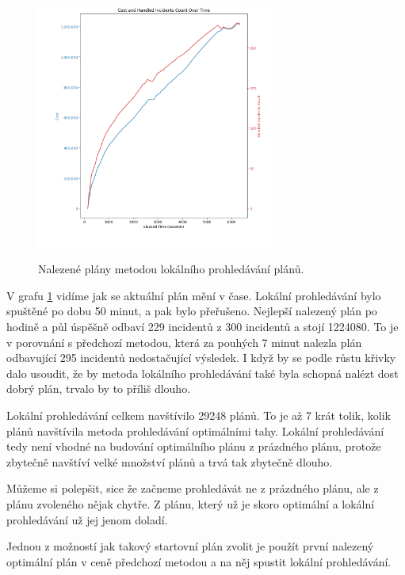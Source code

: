\begin{figure}[H]
  \caption{Nalezené plány metodou lokálního prohledávání plánů.}
  \includegraphics[width=0.7\textwidth,height=0.7\textwidth]{img/plots/localSearch_empty.png}
  \centering
  \label{img:localSearchRes}
\end{figure}

V grafu \ref{img:localSearchRes} vidíme jak se aktuální plán mění v čase.
Lokální prohledávání bylo spuštěné po dobu 50 minut, a pak bylo přeřušeno. 
Nejlepší nalezený plán po hodině a půl úspěšně odbaví 229 incidentů z 300 incidentů a stojí 1224080.
To je v porovnání s předchozí metodou, která za pouhých 7 minut nalezla plán odbavující 295 incidentů nedostačující výsledek.
I když by se podle růstu křivky dalo usoudit, že by metoda lokálního prohledávání také byla schopná nalézt dost dobrý plán, trvalo by to příliš dlouho.

Lokální prohledávání celkem navštívilo 29248 plánů. To je až 7 krát tolik, kolik plánů navštívila metoda prohledávání optimálními tahy.
Lokální prohledávání tedy není vhodné na budování optimálního plánu z prázdného plánu, protože zbytečně navštíví velké množství plánů a trvá tak zbytečně dlouho.

Můžeme si polepšit, sice že začneme prohledávát ne z prázdného plánu, ale z plánu zvoleného nějak chytře. Z plánu, který už je skoro optimální a lokální prohledávání
už jej jenom doladí.

Jednou z možností jak takový startovní plán zvolit je použít první nalezený optimální plán v ceně předchozí metodou a na něj spustit lokální prohledávání.

